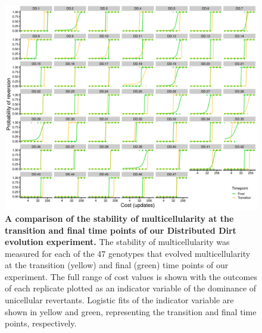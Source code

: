 \documentclass[
]{book}
\begin{document}
\begin{figure}
\centering
\includegraphics{images/Figure_S10_Dist_Dirt_Entrenchment_20DEC22.png}
\caption{\label{fig:dd-entrench-comparison}\textbf{A comparison of the stability of multicellularity at the transition and final time points of our Distributed Dirt evolution experiment.} The stability of multicellularity was measured for each of the 47 genotypes that evolved multicellularity at the transition (yellow) and final (green) time points of our experiment. The full range of cost values is shown with the outcomes of each replicate plotted as an indicator variable of the dominance of unicellular revertants. Logistic fits of the indicator variable are shown in yellow and green, representing the transition and final time points, respectively.}
\end{figure}
\end{document}
